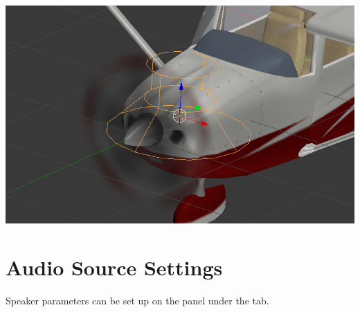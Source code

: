 \documentclass[a4paper,12pt,oneside]{sphinxmanual}
\begin{document}
{\hfill\includegraphics[width=1.000\linewidth]{speaker.jpg}\hfill}

\begin{DUlineblock}{0em}
\item[] 
\end{DUlineblock}


\section{Audio Source Settings}
\label{audio:id2}
Speaker parameters can be set up on the  panel under the  tab.
\end{document}
